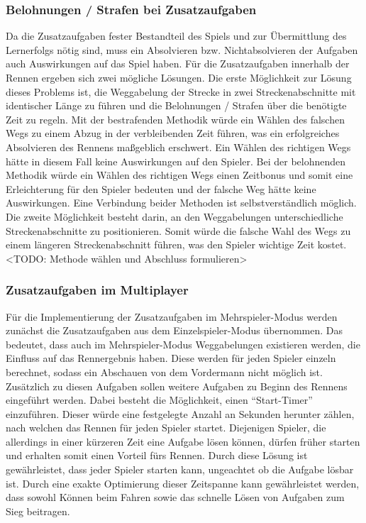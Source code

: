 	\subsubsection{Belohnungen / Strafen bei Zusatzaufgaben}
	Da die Zusatzaufgaben fester Bestandteil des Spiels und zur Übermittlung des Lernerfolgs nötig sind, muss ein Absolvieren bzw. Nichtabsolvieren der Aufgaben auch Auswirkungen auf das Spiel haben. Für die Zusatzaufgaben innerhalb der Rennen ergeben sich zwei mögliche Lösungen.
	Die erste Möglichkeit zur Lösung dieses Problems ist, die Weggabelung der Strecke in zwei Streckenabschnitte mit identischer Länge zu führen und die Belohnungen / Strafen über die benötigte Zeit zu regeln. Mit der bestrafenden Methodik würde ein Wählen des falschen Wegs zu einem Abzug in der verbleibenden Zeit führen, was ein erfolgreiches Absolvieren des Rennens maßgeblich erschwert. Ein Wählen des richtigen Wegs hätte in diesem Fall keine Auswirkungen auf den Spieler.
	Bei der belohnenden Methodik würde ein Wählen des richtigen Wegs einen Zeitbonus und somit eine Erleichterung für den Spieler bedeuten und der falsche Weg hätte keine Auswirkungen. Eine Verbindung beider Methoden ist selbstverständlich möglich.
	Die zweite Möglichkeit besteht darin, an den Weggabelungen unterschiedliche Streckenabschnitte zu positionieren. Somit würde die falsche Wahl des Wegs zu einem längeren Streckenabschnitt führen, was den Spieler wichtige Zeit kostet.
	<TODO: Methode wählen und Abschluss formulieren>

	\subsubsection{Zusatzaufgaben im Multiplayer}
	Für die Implementierung der Zusatzaufgaben im Mehrspieler-Modus werden zunächst die Zusatzaufgaben aus dem Einzelspieler-Modus übernommen. Das bedeutet, dass auch im Mehrspieler-Modus Weggabelungen existieren werden, die Einfluss auf das Rennergebnis haben. Diese werden für jeden Spieler einzeln berechnet, sodass ein Abschauen von dem Vordermann nicht möglich ist. Zusätzlich zu diesen Aufgaben sollen weitere Aufgaben zu Beginn des Rennens eingeführt werden. Dabei besteht die Möglichkeit, einen \enquote{Start-Timer} einzuführen. Dieser würde eine festgelegte Anzahl an Sekunden herunter zählen, nach welchen das Rennen für jeden Spieler startet. Diejenigen Spieler, die allerdings in einer kürzeren Zeit eine Aufgabe lösen können, dürfen früher starten und erhalten somit einen Vorteil fürs Rennen.
	Durch diese Lösung ist gewährleistet, dass jeder Spieler starten kann, ungeachtet ob die Aufgabe lösbar ist. Durch eine exakte Optimierung dieser Zeitspanne kann gewährleistet werden, dass sowohl Können beim Fahren sowie das schnelle Lösen von Aufgaben zum Sieg beitragen.

